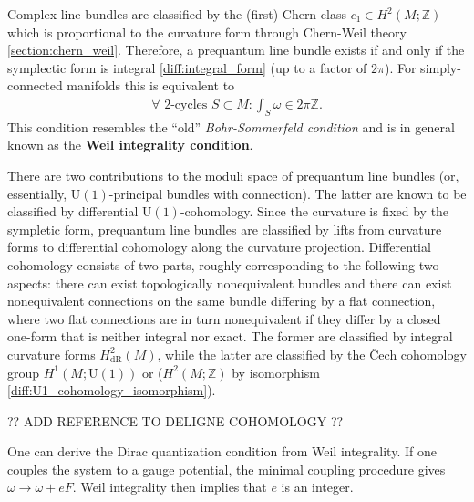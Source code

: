     \begin{property}
        Complex line bundles are classified by the (first) Chern class $c_1\in H^2(M;\mathbb{Z})$ which is proportional to the curvature form through Chern-Weil theory \ref{section:chern_weil}. Therefore, a prequantum line bundle exists if and only if the symplectic form is integral \ref{diff:integral_form} (up to a factor of $2\pi$). For simply-connected manifolds this is equivalent to
        \begin{gather}
            \forall\text{ 2-cycles }S\subset M:\int_S\omega \in 2\pi\mathbb{Z}.
        \end{gather}
        This condition resembles the ``old'' \textit{Bohr-Sommerfeld condition} and is in general known as the \textbf{Weil integrality condition}.

        There are two contributions to the moduli space of prequantum line bundles (or, essentially, $\text{U}(1)$-principal bundles with connection). The latter are known to be classified by differential $\text{U}(1)$-cohomology. Since the curvature is fixed by the sympletic form, prequantum line bundles are classified by lifts from curvature forms to differential cohomology along the curvature projection. Differential cohomology consists of two parts, roughly corresponding to the following two aspects: there can exist topologically nonequivalent bundles and there can exist nonequivalent connections on the same bundle differing by a flat connection, where two flat connections are in turn nonequivalent if they differ by a closed one-form that is neither integral nor exact. The former are classified by integral curvature forms $H^2_{\text{dR}}(M)$, while the latter are classified by the \v{C}ech cohomology group $H^1(M;\text{U}(1))$ or ($H^2(M;\mathbb{Z})$ by isomorphism \eqref{diff:U1_cohomology_isomorphism}).

        ?? ADD REFERENCE TO DELIGNE COHOMOLOGY ??
    \end{property}
    \begin{result}
        One can derive the Dirac quantization condition from Weil integrality. If one couples the system to a gauge potential, the minimal coupling procedure gives $\omega\longrightarrow\omega+eF$. Weil integrality then implies that $e$ is an integer.
    \end{result}


